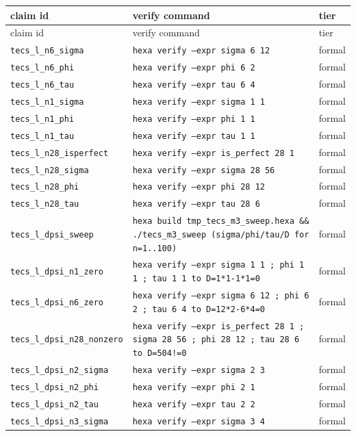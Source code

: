 \documentclass[11pt,a4paper]{article}
\theoremstyle{definition}
\begin{document}
\begingroup\footnotesize\setlength{\tabcolsep}{4pt}
\begin{longtable}{lll}
\toprule claim id & verify command & tier\\ \midrule
\endfirsthead \toprule claim id & verify command & tier\\ \midrule \endhead
\texttt{tecs\_l\_n6\_sigma} & \texttt{hexa verify --expr sigma 6 12} & formal \\
\texttt{tecs\_l\_n6\_phi} & \texttt{hexa verify --expr phi 6 2} & formal \\
\texttt{tecs\_l\_n6\_tau} & \texttt{hexa verify --expr tau 6 4} & formal \\
\texttt{tecs\_l\_n1\_sigma} & \texttt{hexa verify --expr sigma 1 1} & formal \\
\texttt{tecs\_l\_n1\_phi} & \texttt{hexa verify --expr phi 1 1} & formal \\
\texttt{tecs\_l\_n1\_tau} & \texttt{hexa verify --expr tau 1 1} & formal \\
\texttt{tecs\_l\_n28\_isperfect} & \texttt{hexa verify --expr is\_perfect 28 1} & formal \\
\texttt{tecs\_l\_n28\_sigma} & \texttt{hexa verify --expr sigma 28 56} & formal \\
\texttt{tecs\_l\_n28\_phi} & \texttt{hexa verify --expr phi 28 12} & formal \\
\texttt{tecs\_l\_n28\_tau} & \texttt{hexa verify --expr tau 28 6} & formal \\
\texttt{tecs\_l\_dpsi\_sweep} & \texttt{hexa build tmp\_tecs\_m3\_sweep.hexa \&\& ./tecs\_m3\_sweep  (sigma/phi/tau/D for n=1..100)} & formal \\
\texttt{tecs\_l\_dpsi\_n1\_zero} & \texttt{hexa verify --expr sigma 1 1 ; phi 1 1 ; tau 1 1  to D=1*1-1*1=0} & formal \\
\texttt{tecs\_l\_dpsi\_n6\_zero} & \texttt{hexa verify --expr sigma 6 12 ; phi 6 2 ; tau 6 4  to D=12*2-6*4=0} & formal \\
\texttt{tecs\_l\_dpsi\_n28\_nonzero} & \texttt{hexa verify --expr is\_perfect 28 1 ; sigma 28 56 ; phi 28 12 ; tau 28 6  to D=504!=0} & formal \\
\texttt{tecs\_l\_dpsi\_n2\_sigma} & \texttt{hexa verify --expr sigma 2 3} & formal \\
\texttt{tecs\_l\_dpsi\_n2\_phi} & \texttt{hexa verify --expr phi 2 1} & formal \\
\texttt{tecs\_l\_dpsi\_n2\_tau} & \texttt{hexa verify --expr tau 2 2} & formal \\
\texttt{tecs\_l\_dpsi\_n3\_sigma} & \texttt{hexa verify --expr sigma 3 4} & formal \\

\end{longtable}
\end{document}
